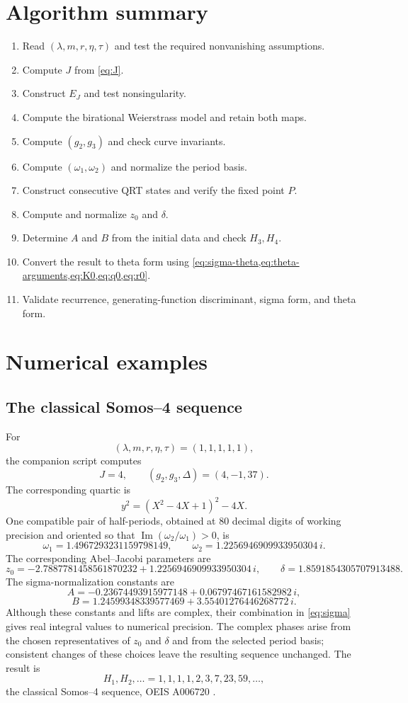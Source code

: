 \documentclass[11pt]{article}
\newcommand{\taupar}{\tau}
\newcommand{\EJ}{E_J}
\begin{document}
\section{Algorithm summary}
\begin{enumerate}[label=\textbf{Step \arabic*.},leftmargin=2.7em]
  \item Read $(\lambda,m,r,\eta,\taupar)$ and test the required nonvanishing
        assumptions.
  \item Compute $J$ from \cref{eq:J}.
  \item Construct $\EJ$ and test nonsingularity.
  \item Compute the birational Weierstrass model and retain both maps.
  \item Compute $(g_2,g_3)$ and check curve invariants.
  \item Compute $(\omega_1,\omega_2)$ and normalize the period basis.
  \item Construct consecutive QRT states and verify the fixed point $P$.
  \item Compute and normalize $z_0$ and $\delta$.
  \item Determine $A$ and $B$ from the initial data and check $H_3,H_4$.
  \item Convert the result to theta form using
        \cref{eq:sigma-theta,eq:theta-arguments,eq:K0,eq:q0,eq:r0}.
  \item Validate recurrence, generating-function discriminant, sigma form,
        and theta form.
\end{enumerate}

\section{Numerical examples}
\label{sec:examples}

\subsection{The classical Somos--4 sequence}
For
\[
  (\lambda,m,r,\eta,\taupar)=(1,1,1,1,1),
\]
the companion script computes
\[
  J=4,
  \qquad
  (g_2,g_3,\Delta)=(4,-1,37).
\]
The corresponding quartic is
\[
  y^2=(X^2-4X+1)^2-4X.
\]
One compatible pair of half-periods, obtained at 80 decimal digits of working
precision and oriented so that $\operatorname{Im}(\omega_2/\omega_1)>0$, is
\[
  \omega_1=1.4967293231159798149,
  \qquad
  \omega_2=1.2256946909933950304\,i.
\]
The corresponding Abel--Jacobi parameters are
\[
  z_0=-2.7887781458561870232+1.2256946909933950304\,i,
  \qquad
  \delta=1.8591854305707913488.
\]
The sigma-normalization constants are
\[
  A=-0.23674493915977148+0.06797467161582982\,i,
\]
\[
  B=1.24599348339577469+3.55401276446268772\,i.
\]
Although these constants and lifts are complex, their combination in
\cref{eq:sigma} gives real integral values to numerical precision. The complex
phases arise from the chosen representatives of $z_0$ and $\delta$ and from
the selected period basis; consistent changes of these choices leave the
resulting sequence unchanged. The result
is
\[
  H_1,H_2,\ldots=1,1,1,1,2,3,7,23,59,\ldots,
\]
the classical Somos--4 sequence, OEIS A006720 \cite{OEISA006720}.
\end{document}
